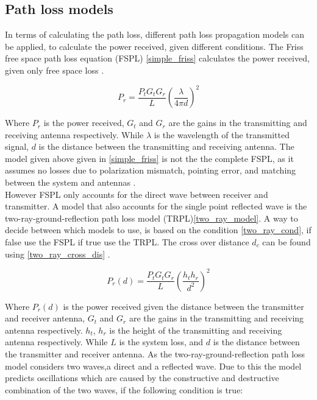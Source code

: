 \subsection{Path loss models}

In terms of calculating the path loss, different path loss propagation models can be applied, to calculate the power received, given different conditions. The Friss free space path loss equation (FSPL) \eqref{simple_friss} calculates the power received, given only free space loss \cite{Chong}.

\begin{equation}
P_r = \frac{P_t G_t G_r}{L} \left(\frac{\lambda}{4 \pi d}\right)^2
\label{simple_friss}
\end{equation}

Where $P_{r}$ is the power received, $G_t$ and $G_r$ are the gains in the transmitting and receiving antenna respectively. While $\lambda$ is the wavelength of the transmitted signal, $d$ is the distance between the transmitting and receiving antenna. The model given above given in \eqref{simple_friss} is not the the complete FSPL, as it assumes no losses due to polarization mismatch, pointing error, and matching between the system and antennas \cite{full_friss}. \\

However FSPL only accounts for the direct wave between receiver and transmitter. A model that also accounts for the single point reflected wave is the two-ray-ground-reflection path loss model (TRPL)\eqref{two_ray_model}. A way to decide between which models to use, is based on the condition \eqref{two_ray_cond}, if false use the FSPL if true use the TRPL. The cross over distance $d_c$ can be found using \eqref{two_ray_cross_dis} \cite{two_ray}. 


\begin{equation}
P_r(d) = \frac{P_t G_t G_r }{L}\left(\frac{h_t h_r}{d^2}\right)^2
\label{two_ray_model}
\end{equation}

Where $P_r(d)$ is the power received given the distance between the transmitter and receiver antenna, $G_t$ and $G_r$ are the gains in the transmitting and receiving antenna respectively. $h_t$, $h_r$ is the height of the transmitting and receiving antenna respectively.  While $L$ is the system loss, and $d$ is the distance between the transmitter and receiver antenna. As the two-ray-ground-reflection path loss model considers two waves,a direct and a reflected wave. Due to this the model predicts  oscillations which are caused by the constructive and destructive combination of the two waves, if the following condition is true:


